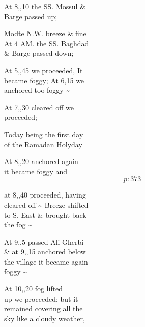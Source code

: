 \documentclass{report}
\begin{document}
	\par{
 	At 8,,10 the SS. Mossul \&\ \\Barge passed up;\ \\
	}

	\par{
 	Modte N.W. breeze \& fine\ \\At 4 AM. the SS. Baghdad\ \\\& Barge passed down;\ \\
	}

	\par{
 	At 5,,45 we proceeded, It\ \\became foggy; At 6,15 we\ \\anchored too foggy \~{}\ \\
	}

	\par{
 	At 7,,30 cleared off we\ \\proceeded;\ \\
	}

	\par{
 	Today being the first day\ \\of the Ramadan Holyday\ \\
	}

	\par{
 	At 8,,20 anchored again\ \\it became foggy and\ \\
  \[p: 373 \]

	}



	\par{
 	at 8,,40 proceeded, having\ \\cleared off \~{} Breeze shifted\ \\to S. East \& brought back\ \\the fog \~{}\ \\
	}

	\par{
 	At 9,,5 passed Ali Gherbi\ \\\& at 9,,15 anchored below\ \\the village it became again\ \\foggy \~{}\ \\
	}

	\par{
 	At 10,,20 fog lifted\ \\up we proceeded; but it\ \\remained covering all the\ \\sky like a cloudy weather,\ \\
	}
\end{document}

